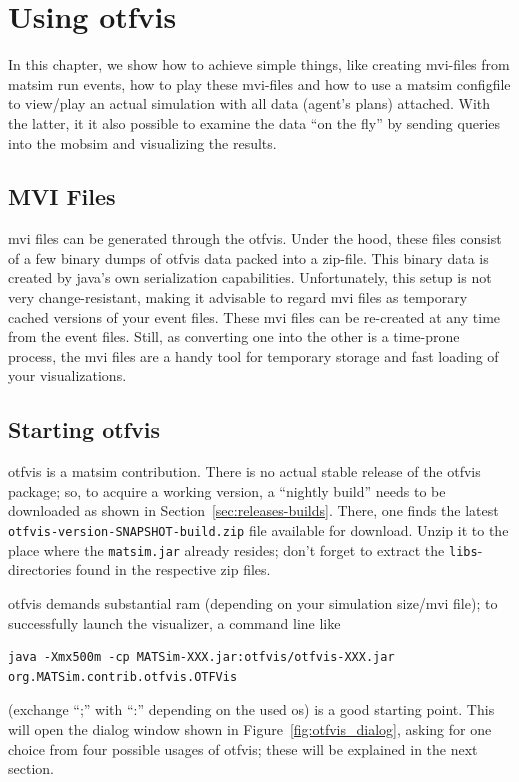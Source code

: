 \section{Using \gls{otfvis}} 
In this chapter, we show how to achieve simple things, like creating \gls{mvi}-files from \gls{matsim} run events, how to play these \gls{mvi}-files and how to use a \gls{matsim} \gls{configfile} to view/play an actual simulation with all data (\eg agent's plans) attached. With the latter, it it also possible to examine the data ``on the fly'' by sending queries into the \gls{mobsim} and visualizing the results.

\subsection{MVI Files}
\gls{mvi} files can be generated through the \gls{otfvis}. Under the hood, these files consist of a few binary dumps of \gls{otfvis} data packed into a zip-file. This binary data is created by \gls{java}'s own serialization capabilities. Unfortunately, this setup is not very change-resistant, making it advisable to regard \gls{mvi} files as temporary cached versions of your event files. These \gls{mvi} files can be re-created at any time from the event files. Still, as converting one into the other is a time-prone process, the \gls{mvi} files are a handy tool for temporary storage and fast loading of your visualizations.

\subsection{Starting \gls{otfvis}}
\gls{otfvis} is a \gls{matsim} \gls{contribution}. 
There is no actual stable release of the \gls{otfvis} package; 
so, to acquire a working version, a ``nightly build'' needs to be downloaded as shown in Section~\ref{sec:releases-builds}. 
There, one finds the latest \lstinline|otfvis-version-SNAPSHOT-build.zip| file available for download. 
Unzip it to the place where the \lstinline|matsim.jar| already resides; don't forget to extract the \lstinline|libs|-directories found in the respective zip files. 

\gls{otfvis} demands substantial \gls{ram} (depending on your simulation size/\gls{mvi} file); to successfully launch the visualizer, a command line like 
\begin{lstlisting}
java -Xmx500m -cp MATSim-XXX.jar:otfvis/otfvis-XXX.jar org.MATSim.contrib.otfvis.OTFVis
\end{lstlisting}
(exchange ``;'' with ``:'' depending on the used \gls{os})
is a good starting point. 
This will open the dialog window shown in Figure~\ref{fig:otfvis_dialog}, asking for one choice from four possible usages of \gls{otfvis}; 
these will be explained in the next section.

